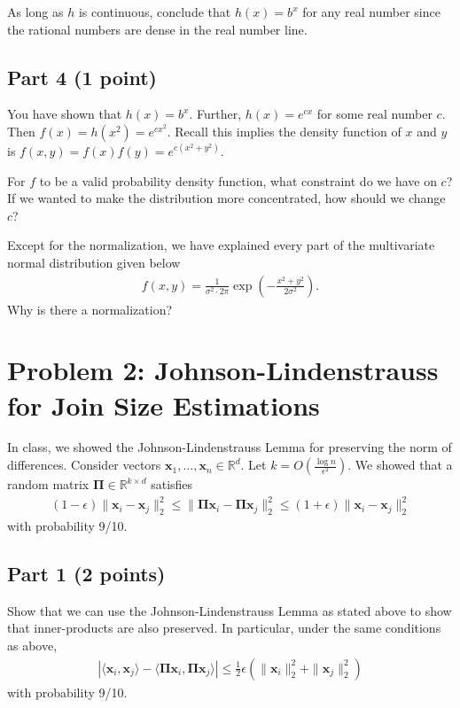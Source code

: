 \documentclass{article}
\begin{document}
As long as $h$ is continuous, conclude that $h(x) = b^x$ for any real number since the rational numbers are dense in the real number line.

\subsection*{Part 4 (1 point)}

You have shown that $h(x) = b^x$. Further, $h(x) = e^{cx}$ for some real number $c$.
Then $f(x) = h(x^2) = e^{c x^2}$.
Recall this implies the density function of $x$ and $y$ is $f(x,y) = f(x) f(y) = e^{c (x^2 + y^2)}$.

For $f$ to be a valid probability density function, what constraint do we have on $c$?
If we wanted to make the distribution more concentrated, how should we change $c$?

Except for the normalization, we have explained every part of the multivariate normal distribution given below
\begin{align*}
f(x,y) = \frac1{\sigma^2 \cdot 2 \pi} \exp\left(-\frac{x^2 + y^2}{2\sigma^2}\right).
\end{align*}
Why is there a normalization?

%

\newpage

\section*{Problem 2: Johnson-Lindenstrauss for Join Size Estimations}

In class, we showed the Johnson-Lindenstrauss Lemma for preserving the norm of differences.
Consider vectors $\mathbf{x}_1, \ldots, \mathbf{x}_n \in \mathbb{R}^d$.
Let $k = O\left( \frac{\log n}{\epsilon^2} \right)$.
We showed that a random matrix $\mathbf{\Pi} \in \mathbb{R}^{k \times d}$ satisfies
\begin{align}
(1-\epsilon) \| \mathbf{x}_i - \mathbf{x}_j \|_2^2
\leq \| \mathbf{\Pi x}_i - \mathbf{\Pi x}_j \|_2^2
\leq (1+\epsilon) \| \mathbf{x}_i - \mathbf{x}_j \|_2^2
\end{align}
with probability 9/10.

\subsection*{Part 1 (2 points)}
Show that we can use the Johnson-Lindenstrauss Lemma as stated above to show that inner-products are also preserved.
In particular, under the same conditions as above,
\begin{align}
|
\langle \mathbf{x}_i, \mathbf{x}_j \rangle
- \langle \mathbf{\Pi x}_i, \mathbf{\Pi x}_j \rangle
|
\leq \frac12 \epsilon (\|\mathbf{x}_i\|_2^2 + \|\mathbf{x}_j\|_2^2)
\end{align}
with probability 9/10.
\end{document}
